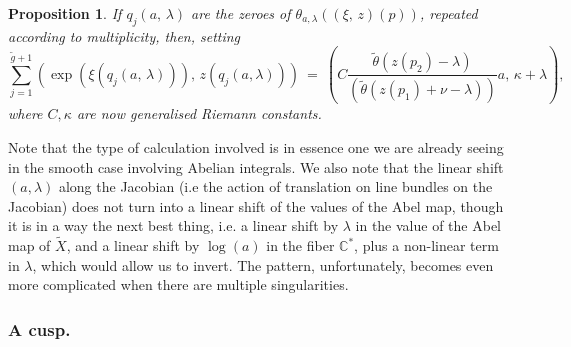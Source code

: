 \documentclass[12pt,reqno]{amsart}
\numberwithin{equation}{section}
\newtheorem{proposition}[theorem]{Proposition}
\theoremstyle{definition}
\theoremstyle{remark}
\def\bC{{\mathbb {C}}}
\begin{document}
\begin{proposition}
If $q_j(a,\, \lambda)$ are the zeroes of $\theta_{a,\lambda}((\xi,\,z)(p))$, repeated according to multiplicity,
then, setting 
$$\sum_{j=1}^{\widetilde g +1} (\exp(\xi(q_j(a,\, \lambda))),\, z(q_j(a, \lambda)))  
\ =\ (C   \frac {\widetilde{\theta} (z(p_2)-\lambda )} { (\widetilde{\theta}(z(p_1) +\nu -\lambda))} a,\,  \kappa +\lambda) ,$$
where $C, \kappa $ are now   generalised Riemann constants.
\end{proposition}

Note that the type of calculation involved is in essence one we are already seeing in the smooth case 
involving Abelian integrals. We also note that the linear shift $(a, \lambda)$ along the Jacobian (i.e the action of translation on line bundles on the Jacobian) does not turn into a linear shift of the values of the Abel map, though it is in a way the next best thing, i.e. a linear shift by $\lambda$ in the value of the Abel map of $\widetilde X$, and a linear shift by $\log(a)$ in the fiber $\bC^*$, plus a non-linear term in $\lambda$, which would allow us to invert.  The pattern, unfortunately, becomes even more complicated when there are multiple singularities. 

\subsubsection{A cusp.}
\end{document}
